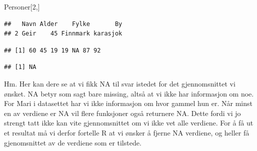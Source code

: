 \documentclass[
]{article}
\newenvironment{Shaded}{\begin{snugshade}}{\end{snugshade}}
\newcommand{\CommentTok}[1]{\textcolor[rgb]{0.56,0.35,0.01}{\textit{#1}}}
\newcommand{\DecValTok}[1]{\textcolor[rgb]{0.00,0.00,0.81}{#1}}
\newcommand{\KeywordTok}[1]{\textcolor[rgb]{0.13,0.29,0.53}{\textbf{#1}}}
\newcommand{\NormalTok}[1]{#1}
\newcommand{\OperatorTok}[1]{\textcolor[rgb]{0.81,0.36,0.00}{\textbf{#1}}}
\begin{document}
\begin{Shaded}
\begin{Highlighting}[]
\NormalTok{Personer[}\DecValTok{2}\NormalTok{,]}
\end{Highlighting}
\end{Shaded}

\begin{verbatim}
##   Navn Alder    Fylke       By
## 2 Geir    45 Finnmark karasjok
\end{verbatim}

\begin{Shaded}
\end{Shaded}

\begin{verbatim}
## [1] 60 45 19 19 NA 87 92
\end{verbatim}

\begin{Shaded}
\end{Shaded}

\begin{verbatim}
## [1] NA
\end{verbatim}

Hm. Her kan dere se at vi fikk NA til svar istedet for det
gjennomsnittet vi ønsket. NA betyr som sagt bare missing, altså at vi
ikke har informasjon om noe. For Mari i datasettet har vi ikke
informasjon om hvor gammel hun er. Når minst en av verdiene er NA vil
flere funksjoner også returnere NA. Dette fordi vi jo strengt tatt ikke
kan vite gjennomsnittet om vi ikke vet alle verdiene. For å få ut et
resultat må vi derfor fortelle R at vi ønsker å fjerne NA verdiene, og
heller få gjenomsnittet av de verdiene som er tilstede.
\end{document}
